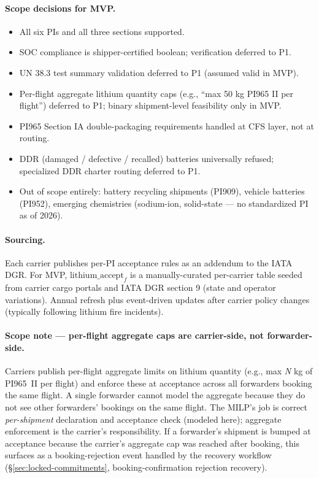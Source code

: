 \documentclass[11pt,a4paper]{article}
\theoremstyle{definition}
\begin{document}
\paragraph{Scope decisions for MVP.}
\begin{itemize}[noitemsep]
  \item All six PIs and all three sections supported.
  \item SOC compliance is shipper-certified boolean; verification deferred to P1.
  \item UN 38.3 test summary validation deferred to P1 (assumed valid in MVP).
  \item Per-flight aggregate lithium quantity caps (e.g., ``max 50 kg PI965 II per
        flight'') deferred to P1; binary shipment-level feasibility only in MVP.
  \item PI965 Section IA double-packaging requirements handled at CFS layer, not
        at routing.
  \item DDR (damaged / defective / recalled) batteries universally refused;
        specialized DDR charter routing deferred to P1.
  \item Out of scope entirely: battery recycling shipments (PI909), vehicle
        batteries (PI952), emerging chemistries (sodium-ion, solid-state — no
        standardized PI as of 2026).
\end{itemize}

\paragraph{Sourcing.}
Each carrier publishes per-PI acceptance rules as an addendum to the IATA DGR.
For MVP, \(\text{lithium\_accept}_f\) is a manually-curated per-carrier table
seeded from carrier cargo portals and IATA DGR section 9 (state and operator
variations). Annual refresh plus event-driven updates after carrier policy
changes (typically following lithium fire incidents).

\paragraph{Scope note --- per-flight aggregate caps are carrier-side, not forwarder-side.}
Carriers publish per-flight aggregate limits on lithium quantity (e.g., max
\textit{N} kg of PI965~II per flight) and enforce these at acceptance across all
forwarders booking the same flight. A single forwarder cannot model the aggregate
because they do not see other forwarders' bookings on the same flight. The MILP's
job is correct \emph{per-shipment} declaration and acceptance check (modeled here);
aggregate enforcement is the carrier's responsibility. If a forwarder's shipment
is bumped at acceptance because the carrier's aggregate cap was reached after
booking, this surfaces as a booking-rejection event handled by the recovery
workflow (\S\ref{sec:locked-commitments}, booking-confirmation rejection recovery).
\end{document}
